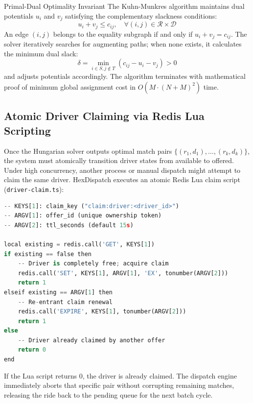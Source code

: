 \documentclass[11pt,a4paper]{article}
\begin{document}
\begin{systembox}{Primal-Dual Optimality Invariant}
The Kuhn-Munkres algorithm maintains dual potentials $u_i$ and $v_j$ satisfying the complementary slackness conditions:
\begin{equation}
    u_i + v_j \le c_{ij}, \quad \forall (i, j) \in \mathcal{R} \times \mathcal{D}
\end{equation}
An edge $(i, j)$ belongs to the equality subgraph if and only if $u_i + v_j = c_{ij}$. The solver iteratively searches for augmenting paths; when none exists, it calculates the minimum dual slack:
\begin{equation}
    \delta = \min_{i \in S, j \notin T} (c_{ij} - u_i - v_j) > 0
\end{equation}
and adjusts potentials accordingly. The algorithm terminates with mathematical proof of minimum global assignment cost in $O(M \cdot (N+M)^2)$ time.
\end{systembox}

\subsection{Atomic Driver Claiming via Redis Lua Scripting}
Once the Hungarian solver outputs optimal match pairs $\{(r_1, d_1), \dots, (r_k, d_k)\}$, the system must atomically transition driver states from available to offered. Under high concurrency, another process or manual dispatch might attempt to claim the same driver. HexDispatch executes an atomic Redis Lua claim script (\texttt{driver-claim.ts}):

\begin{lstlisting}[language=Python, caption={Atomic Redis Lua Driver Claim Script}]
-- KEYS[1]: claim_key ("claim:driver:<driver_id>")
-- ARGV[1]: offer_id (unique ownership token)
-- ARGV[2]: ttl_seconds (default 15s)

local existing = redis.call('GET', KEYS[1])
if existing == false then
    -- Driver is completely free; acquire claim
    redis.call('SET', KEYS[1], ARGV[1], 'EX', tonumber(ARGV[2]))
    return 1
elseif existing == ARGV[1] then
    -- Re-entrant claim renewal
    redis.call('EXPIRE', KEYS[1], tonumber(ARGV[2]))
    return 1
else
    -- Driver already claimed by another offer
    return 0
end
\end{lstlisting}

If the Lua script returns 0, the driver is already claimed. The dispatch engine immediately aborts that specific pair without corrupting remaining matches, releasing the ride back to the pending queue for the next batch cycle.
\end{document}
